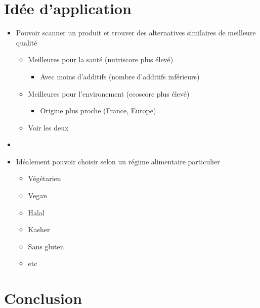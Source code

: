 \section{Idée d'application}
\begin{frame}
  \begin{itemize}
    \item Pouvoir scanner un produit et trouver des alternatives similaires de meilleure qualité
    \begin{itemize}
      \item Meilleures pour la santé (nutriscore plus élevé)
      \begin{itemize}
        \item Avec moins d'additifs (nombre d'additifs inférieurs)
      \end{itemize}
      \item Meilleures pour l'environement (ecoscore plus élevé)
      \begin{itemize}
        \item Origine plus proche (France, Europe)
      \end{itemize}
      \item Voir les deux
      
    \end{itemize}
    \item[]
    \item Idéalement pouvoir choisir selon un régime alimentaire particulier
    \begin{itemize}
      \item Végétarien
      \item Vegan
      \item Halal
      \item Kasher
      \item Sans gluten
      \item etc
    \end{itemize}
  \end{itemize}
\end{frame}

\section{Conclusion}

